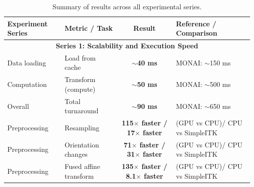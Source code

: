 \documentclass[a4paper,10pt,preprint]{elsarticle}
\begin{document}
\begin{table}[H]
\centering
\caption{Summary of results across all experimental series.}
\label{tab:all_results}
\renewcommand{\arraystretch}{1.3} %

\begin{tabularx}{\textwidth}{|l|>{\raggedright\arraybackslash}X|c|>{\raggedright\arraybackslash}X|}
\hline
\textbf{Experiment Series} & \textbf{Metric / Task} & \textbf{Result} & \textbf{Reference / Comparison} \\
\hline

\multicolumn{4}{|c|}{\textbf{Series 1: Scalability and Execution Speed}} \\
\hline
Data loading & Load from cache & \textbf{$\sim$40 ms} & MONAI: $\sim$150 ms \\
Computation & Transform (compute) & \textbf{$\sim$50 ms} & MONAI: $\sim$500 ms\\
Overall & Total turnaround & \textbf{$\sim$90 ms} & MONAI: $\sim$650 ms\\
Preprocessing & Resampling & {\textbf{115$\times$ faster / 17$\times$ faster}} & (GPU vs CPU)/ CPU vs SimpleITK \\
Preprocessing & Orientation changes & \textbf{71$\times$ faster / 31$\times$ faster} & (GPU vs CPU)/ CPU vs SimpleITK \\
Preprocessing & Fused affine transform & \textbf{135$\times$ faster / 8.1$\times$ faster} &  (GPU vs CPU)/ CPU vs SimpleITK \\
\hline


\end{tabularx}
\end{table}
\end{document}
